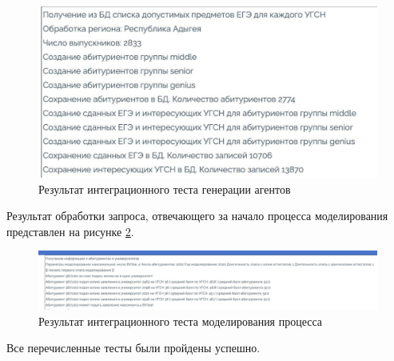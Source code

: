 \begin{figure}[hbtp]
	\centering
	\includegraphics[scale=0.3]{img/test2.pdf}
	\caption{Результат интеграционного теста генерации агентов}
	\label{test2}
\end{figure}

Результат обработки запроса, отвечающего за начало процесса моделирования представлен на рисунке \ref{test3.1}.


\begin{figure}[hbtp]
	\centering
	\includegraphics[scale=0.17]{img/test3.1.pdf}
	\caption{Результат интеграционного теста моделирования процесса}
	\label{test3.1}
\end{figure}


Все перечисленные тесты были пройдены успешно.




\pagebreak